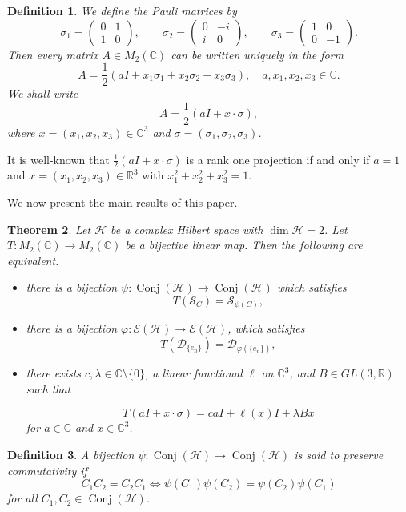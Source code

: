 \documentclass[11pt]{amsart}
\newtheorem{theorem}{Theorem}
\newtheorem{definition}[theorem]{Definition}
\theoremstyle{remark}
\newcommand{\cH}{{\mathcal{H}}}
\newcommand{\SC}{\mathcal{S}_C}
\newcommand{\Conj}{\operatorname{Conj}(\cH)}
\begin{document}
\begin{definition} 
We define the Pauli matrices by
\[
\sigma_1=
\begin{pmatrix}
0&1\\
1&0
\end{pmatrix},
\qquad
\sigma_2=
\begin{pmatrix}
0&-i\\
i&0
\end{pmatrix},
\qquad
\sigma_3=
\begin{pmatrix}
1&0\\
0&-1
\end{pmatrix}. 
\]
Then every matrix $A\in M_2(\mathbb{C})$ can be written uniquely in the form
\[
A=\frac{1}{2}(aI+x_1\sigma_1+x_2\sigma_2+x_3\sigma_3), \quad a, x_1, x_2, x_3 \in \mathbb{C}. 
\]
We shall write
\[
A=\frac{1}{2}(aI+x\cdot \sigma), 
\]
where  $x=(x_1, x_2, x_3) \in \mathbb{C}^3$ and $\sigma=(\sigma_1, \sigma_2, \sigma_3)$. 
\end{definition}
It is well-known that $\frac{1}{2}(aI+x\cdot \sigma)$ is a rank one projection if and only if $a=1$ and $x=(x_1, x_2, x_3) \in \mathbb{R}^3$ with $x_1^2+x_2^2+x_3^2=1$. 

We now present the main results of this paper.

\begin{theorem}\label{main0}
Let $\cH$ be a complex Hilbert space with $\dim \cH=2$.  Let $T: M_2(\mathbb{C}) \to M_2(\mathbb{C})$ be a bijective linear map. Then the following are equivalent.
\begin{itemize}
\item[(1)] there is a bijection $\psi: \Conj \to \Conj$ which satisfies  
 \[
T(\SC) = {\mathcal{S}_{\psi(C)}},
\]
\item[(2)] there is a bijection $\varphi: \mathcal{E}(\cH) \to \mathcal{E}(\cH)$,  which satisfies  
\[
T(\mathcal{D}_{\{e_n\}}) = \mathcal{D}_{\varphi(\{e_n\})},
\] 
\item[(3)] there exists $c, \lambda \in \mathbb{C} \setminus \{0\}$, a linear functional $\ell$ on $\mathbb{C}^3$, and $B \in GL(3,\mathbb{R})$ such that 

\[
T(aI+x\cdot \sigma)=c aI+\ell(x)I+\lambda Bx
\] 
for  $a \in \mathbb{C}$ and $x \in \mathbb{C}^3$.
\end{itemize}

\end{theorem}

\begin{definition}
A bijection $\psi: \Conj \to \Conj$ is said to preserve commutativity if 
\[
 C_1C_2=C_2C_1 \Longleftrightarrow \psi(C_1)\psi(C_2)=\psi(C_2)\psi(C_1)
 \]
for all $C_1, C_2 \in \Conj$.

\end{definition}
\end{document}
